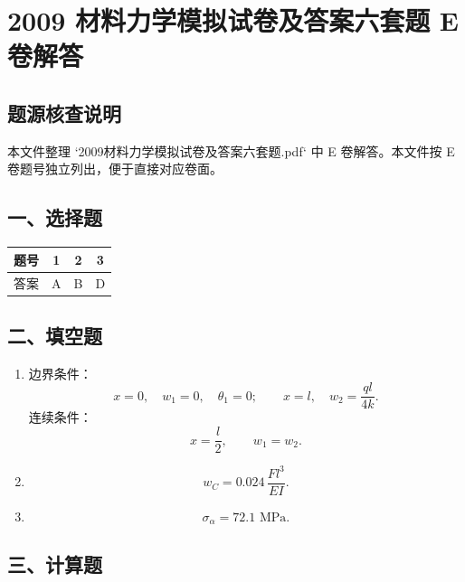 \documentclass[11pt,a4paper]{ctexrep}
\newcommand{\assetdir}{}
\begin{document}
\chapter{2009 材料力学模拟试卷及答案六套题 E 卷解答}
{
\renewcommand{\assetdir}{../../考题_按知识点整理/visual_assets/question_crops/2009_2009材料力学模拟试卷及答案六套题}


\vspace{-1.0cm}

\section*{题源核查说明}

本文件整理 `2009材料力学模拟试卷及答案六套题.pdf` 中 E 卷解答。本文件按 E 卷题号独立列出，便于直接对应卷面。

\section*{一、选择题}

\begin{center}
\begin{tabular}{c c c c}
\toprule
题号 & 1 & 2 & 3\\
\midrule
答案 & A & B & D\\
\bottomrule
\end{tabular}
\end{center}

\section*{二、填空题}

\begin{enumerate}
    \item 边界条件：
    \[
        x=0,\quad w_1=0,\quad \theta_1=0;
        \qquad
        x=l,\quad w_2=\frac{ql}{4k}.
    \]
    连续条件：
    \[
        x=\frac{l}{2},\qquad w_1=w_2.
    \]

    \item
    \[
        w_C=0.024\,\frac{F l^3}{EI}.
    \]

    \item
    \[
        \sigma_{\alpha}=72.1\text{ MPa}.
    \]
\end{enumerate}

\section*{三、计算题}

}
\end{document}
